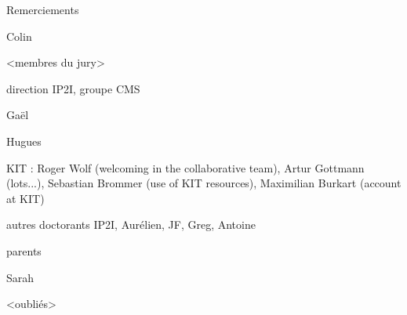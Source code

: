 Remerciements

Colin

<membres du jury>

direction IP2I, groupe CMS

Gaël

Hugues

KIT : Roger Wolf (welcoming in the collaborative team), Artur Gottmann (lots...), Sebastian Brommer (use of KIT resources), Maximilian Burkart (account at KIT)

autres doctorants IP2I, Aurélien, JF, Greg, Antoine

parents

Sarah

<oubliés>
